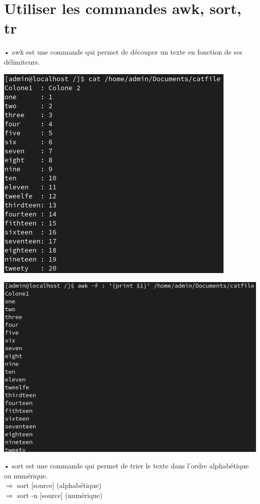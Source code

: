 \documentclass[a4paper, 11pt, french, oneside]{book}
\begin{document}
\section{\Large Utiliser les commandes awk, sort, tr} 
• awk est une commande qui permet de découper un texte en fonction de ses délimiteurs.
\begin{flushleft}
\includegraphics{AWK1.jpg}
\end{flushleft}
\begin{flushleft}
\includegraphics{AWK2.jpg}
\end{flushleft}

• sort est une commande qui permet de trier le texte dans l’ordre alphabétique ou numérique.\\
$\Rightarrow$ sort [source] (alphabétique)\\
$\Rightarrow$ sort -n [source] (numérique)\\
\end{document}
